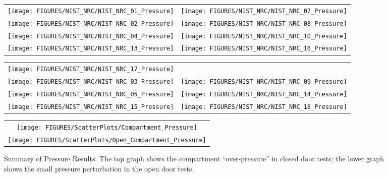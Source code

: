 \begin{figure}[p]
\begin{tabular*}{\textwidth}{l@{\extracolsep{\fill}}r}
\texttt{[image: FIGURES/NIST\_NRC/NIST\_NRC\_01\_Pressure]} &
\texttt{[image: FIGURES/NIST\_NRC/NIST\_NRC\_07\_Pressure]} \\
\texttt{[image: FIGURES/NIST\_NRC/NIST\_NRC\_02\_Pressure]} &
\texttt{[image: FIGURES/NIST\_NRC/NIST\_NRC\_08\_Pressure]} \\
\texttt{[image: FIGURES/NIST\_NRC/NIST\_NRC\_04\_Pressure]} &
\texttt{[image: FIGURES/NIST\_NRC/NIST\_NRC\_10\_Pressure]} \\
\texttt{[image: FIGURES/NIST\_NRC/NIST\_NRC\_13\_Pressure]} &
\texttt{[image: FIGURES/NIST\_NRC/NIST\_NRC\_16\_Pressure]}
\end{tabular*}
\label{NIST_NRC_Pressure_Closed}
\end{figure}

\begin{figure}[p]
\begin{tabular*}{\textwidth}{l@{\extracolsep{\fill}}r}
\texttt{[image: FIGURES/NIST\_NRC/NIST\_NRC\_17\_Pressure]} &
   \\
\texttt{[image: FIGURES/NIST\_NRC/NIST\_NRC\_03\_Pressure]} &
\texttt{[image: FIGURES/NIST\_NRC/NIST\_NRC\_09\_Pressure]} \\
\texttt{[image: FIGURES/NIST\_NRC/NIST\_NRC\_05\_Pressure]} &
\texttt{[image: FIGURES/NIST\_NRC/NIST\_NRC\_14\_Pressure]} \\
\texttt{[image: FIGURES/NIST\_NRC/NIST\_NRC\_15\_Pressure]} &
\texttt{[image: FIGURES/NIST\_NRC/NIST\_NRC\_18\_Pressure]}
\end{tabular*}
\label{NIST_NRC_Pressure_Open}
\end{figure}

\begin{figure}[p]
\begin{center}
\begin{tabular}{c}
\texttt{[image: FIGURES/ScatterPlots/Compartment\_Pressure]} \\
\texttt{[image: FIGURES/ScatterPlots/Open\_Compartment\_Pressure]}
\end{tabular}
\end{center}
\caption[Summary of pressure predictions, NIST/NRC test series.]
{Summary of Pressure Results. The top graph shows the compartment ``over-pressure'' in closed door tests; the lower graph
shows the small pressure perturbation in the open door tests.}
\end{figure}



